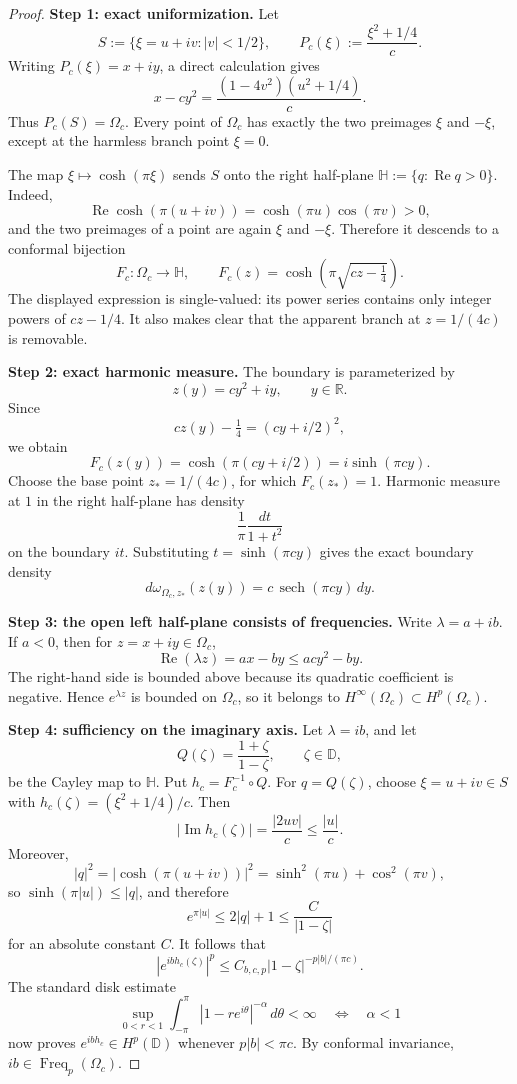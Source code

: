 \documentclass[11pt]{article}
\newcommand{\D}{\mathbb D}
\newcommand{\Hh}{\mathbb H}
\newcommand{\Freq}{\operatorname{Freq}}
\begin{document}
\begin{proof}
\textbf{Step 1: exact uniformization.}
Let
\[
 S:=\{\xi=u+iv:|v|<1/2\},\qquad
 P_c(\xi):=\frac{\xi^2+1/4}{c}.
\]
Writing \(P_c(\xi)=x+iy\), a direct calculation gives
\[
 x-cy^2
 =\frac{(1-4v^2)(u^2+1/4)}{c}.
\]
Thus \(P_c(S)=\Omega_c\).  Every point of \(\Omega_c\) has exactly the
two preimages \(\xi\) and \(-\xi\), except at the harmless branch point
\(\xi=0\).

The map \(\xi\mapsto\cosh(\pi\xi)\) sends \(S\) onto the right half-plane
\(\Hh:=\{q:\operatorname{Re}q>0\}\).  Indeed,
\[
 \operatorname{Re}\cosh(\pi(u+iv))
 =\cosh(\pi u)\cos(\pi v)>0,
\]
and the two preimages of a point are again \(\xi\) and \(-\xi\).
Therefore it descends to a conformal bijection
\[
 F_c:\Omega_c\longrightarrow\Hh,\qquad
 F_c(z)=\cosh\!\left(\pi\sqrt{cz-\tfrac14}\right).
\]
The displayed expression is single-valued: its power series contains only
integer powers of \(cz-1/4\).  It also makes clear that the apparent branch
at \(z=1/(4c)\) is removable.

\textbf{Step 2: exact harmonic measure.}
The boundary is parameterized by
\[
 z(y)=c y^2+iy,\qquad y\in\mathbb R.
\]
Since
\[
 cz(y)-\tfrac14=(cy+i/2)^2,
\]
we obtain
\[
 F_c(z(y))=\cosh(\pi(cy+i/2))=i\sinh(\pi c y).
\]
Choose the base point \(z_*=1/(4c)\), for which \(F_c(z_*)=1\).
Harmonic measure at \(1\) in the right half-plane has density
\[
 \frac{1}{\pi}\frac{dt}{1+t^2}
\]
on the boundary \(it\).  Substituting \(t=\sinh(\pi c y)\) gives the exact
boundary density
\begin{equation}\label{eq:harmonic-density}
 d\omega_{\Omega_c,z_*}(z(y))
 =c\,\operatorname{sech}(\pi c y)\,dy.
\end{equation}

\textbf{Step 3: the open left half-plane consists of frequencies.}
Write \(\lambda=a+ib\).  If \(a<0\), then for \(z=x+iy\in\Omega_c\),
\[
 \operatorname{Re}(\lambda z)=ax-by
 \leq acy^2-by.
\]
The right-hand side is bounded above because its quadratic coefficient is
negative.  Hence \(e^{\lambda z}\) is bounded on \(\Omega_c\), so it belongs
to \(H^\infty(\Omega_c)\subset H^p(\Omega_c)\).

\textbf{Step 4: sufficiency on the imaginary axis.}
Let \(\lambda=ib\), and let
\[
 Q(\zeta)=\frac{1+\zeta}{1-\zeta},\qquad \zeta\in\D,
\]
be the Cayley map to \(\Hh\).  Put
\(h_c=F_c^{-1}\circ Q\).  For \(q=Q(\zeta)\), choose
\(\xi=u+iv\in S\) with \(h_c(\zeta)=(\xi^2+1/4)/c\).
Then
\[
 |\operatorname{Im}h_c(\zeta)|=\frac{|2uv|}{c}\leq\frac{|u|}{c}.
\]
Moreover,
\[
 |q|^2
 =|\cosh(\pi(u+iv))|^2
 =\sinh^2(\pi u)+\cos^2(\pi v),
\]
so \(\sinh(\pi|u|)\leq|q|\), and therefore
\[
 e^{\pi|u|}\leq 2|q|+1\leq\frac{C}{|1-\zeta|}
\]
for an absolute constant \(C\).  It follows that
\[
 |e^{ib h_c(\zeta)}|^p
 \leq C_{b,c,p}|1-\zeta|^{-p|b|/(\pi c)}.
\]
The standard disk estimate
\[
 \sup_{0<r<1}\int_{-\pi}^{\pi}
 |1-re^{i\theta}|^{-\alpha}\,d\theta<\infty
 \quad\Longleftrightarrow\quad \alpha<1
\]
now proves \(e^{ib h_c}\in H^p(\D)\) whenever
\(p|b|<\pi c\).  By conformal invariance, \(ib\in\Freq_p(\Omega_c)\).


\end{proof}
\end{document}
